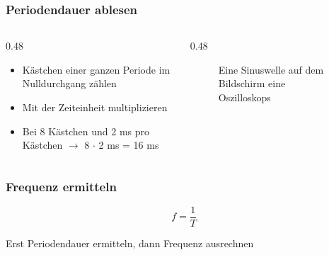 \begin{frame}
\frametitle{Periodendauer ablesen}
\begin{columns}
    \begin{column}{0.48\textwidth}
    \begin{itemize}
  \item Kästchen einer ganzen Periode im Nulldurchgang zählen
  \item Mit der Zeiteinheit multiplizieren
  \item Bei 8 Kästchen und 2 ms pro Kästchen $\rightarrow$ 8 $\cdot$ 2 ms = 16 ms
  \end{itemize}

    \end{column}
   \begin{column}{0.48\textwidth}
       
\begin{figure}
    \caption{\scriptsize Eine Sinuswelle auf dem Bildschirm eine Oszilloskops}
    \label{e_sinuswelle_oszilloskop}
\end{figure}


   \end{column}
\end{columns}

\end{frame}

\begin{frame}
\end{frame}

\begin{frame}
\frametitle{Frequenz ermitteln}
$$f = \dfrac{1}{T}$$

Erst Periodendauer ermitteln, dann Frequenz ausrechnen

\end{frame}


